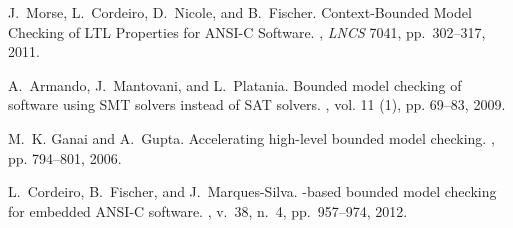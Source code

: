 \documentclass[a4paper]{llncs}
\begin{document}
{\begin{thebibliography}{10}
J.~Morse, L.~Cordeiro, D.~Nicole, and B.~Fischer.
\newblock Context-Bounded Model Checking of LTL Properties for ANSI-C Software.
, {\em LNCS} 7041, pp.\ 302--317, 2011.

A.~Armando, J.~Mantovani, and L.~Platania.
\newblock Bounded model checking of software using {SMT} solvers instead of
  {SAT} solvers.
, vol. 11 (1), pp. 69--83, 2009.

M.~K. Ganai and A.~Gupta.
\newblock Accelerating high-level bounded model checking.
, pp. 794--801, 2006.

L.~Cordeiro, B.~Fischer, and J.~Marques-Silva.
-based bounded model checking for embedded {ANSI-C} software.
, v.\ 38, n.\ 4, pp.\ 957--974, 2012. 



\end{thebibliography}}
\end{document}

